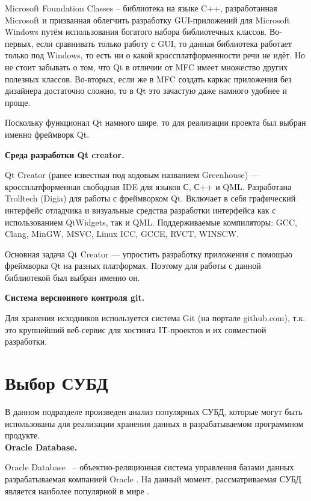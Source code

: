 Microsoft Foundation Classes – библиотека на языке C++, разработанная Microsoft и призванная облегчить разработку GUI-приложений для Microsoft Windows путём использования богатого набора библиотечных классов.
Во-первых, если сравнивать только работу с GUI, то данная библиотека работает только под Windows, то есть ни о какой кроссплатформенности речи не идёт. Но не стоит забывать о том, что Qt в отличии от MFC имеет множество других полезных классов. Во-вторых, если же в MFC создать каркас приложения без дизайнера достаточно сложно, то в Qt это зачастую даже намного удобнее и проще.

Поскольку функционал Qt намного шире, то для реализации проекта был выбран именно фреймворк Qt.

\noindent\textbf{Среда разработки Qt creator.}

Qt Creator (ранее известная под кодовым названием Greenhouse) — кроссплатформенная свободная IDE для языков С, С++ и QML. Разработана Trolltech (Digia) для работы с фреймворком Qt. Включает в себя графический интерфейс отладчика и визуальные средства разработки интерфейса как с использованием QtWidgets, так и QML. Поддерживаемые компиляторы: GCC, Clang, MinGW, MSVC, Linux ICC, GCCE, RVCT, WINSCW.

Основная задача Qt Creator — упростить разработку приложения с помощью фреймворка Qt на разных платформах. Поэтому для работы с данной библиотекой был выбран именно он.

\noindent\textbf{Система версионного контроля git.}

Для хранения исходников используется система Git (на портале github.com), т.к. это крупнейший веб-сервис для хостинга IT-проектов и их совместной разработки.

\section{Выбор СУБД}

В данном подразделе произведен анализ популярных СУБД, которые могут быть использованы для реализации хранения данных в разрабатываемом программном продукте.\\

\noindent\textbf{Oracle Database.}

Oracle Database~\cite{oracle} -- объектно-реляционная система управления базами данных разрабатываемая компанией Oracle \cite{oracle-company}. На данный момент, рассматриваемая СУБД является наиболее популярной в мире \cite{oracle-popular}. 

